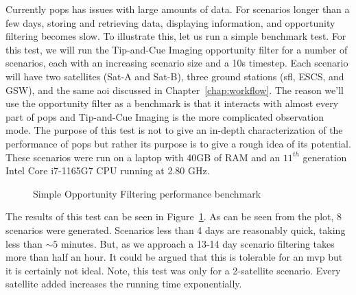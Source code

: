 Currently \gls{pops} has issues with large amounts of data. For scenarios
longer than a few days, storing and retrieving data, displaying information,
and opportunity filtering becomes slow. To illustrate this, let us run a simple
benchmark test. For this test, we will run the Tip-and-Cue Imaging opportunity
filter for a number of scenarios, each with an increasing scenario size and a
10s timestep. Each scenario will have two satellites (Sat-A and Sat-B), three
ground stations (\acrshort{sfl}, ESCS, and GSW), and the same \gls{aoi}
discussed in Chapter~\ref{chap:workflow}. The reason we'll use the opportunity
filter as a benchmark is that it interacts with almost every part of \gls{pops}
and Tip-and-Cue Imaging is the more complicated observation mode.
The purpose of this test is not to give an in-depth characterization of the
performance of \gls{pops} but rather its purpose is to give a rough idea of its
potential.  These scenarios were run on a laptop with 40GB of RAM and an
$11^{th}$ generation Intel Core i7-1165G7 CPU running at 2.80 GHz. 


\begin{figure}[h]
    \centering
    \caption{Simple Opportunity Filtering performance benchmark}
    \label{fig:performance-benchmark}
\end{figure}

The results of this test can be seen in Figure~\ref{fig:performance-benchmark}.
As can be seen from the plot, 8 scenarios were generated. Scenarios less than 4
days are reasonably quick, taking less than $\sim5$ minutes. But, as we
approach a 13-14 day scenario filtering takes more than half an hour. It could
be argued that this is tolerable for an \gls{mvp} but it is certainly not
ideal.  Note, this test was only for a 2-satellite scenario. Every satellite
added increases the running time exponentially. 

